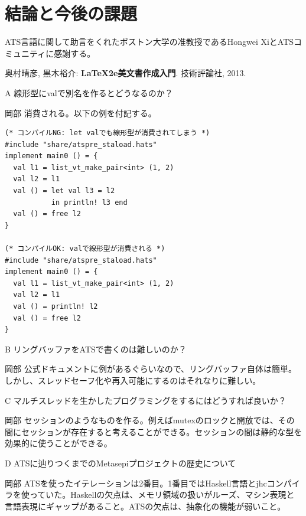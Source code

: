 \documentclass{ipsjprosym}
\begin{document}
\section{結論と今後の課題}

\begin{acknowledgment}
ATS言語に関して助言をくれたボストン大学の准教授であるHongwei XiとATSコミュニティに感謝する。
\end{acknowledgment}

% 
% 

\begin{thebibliography}{9}
  奥村晴彦, 黒木裕介: \textbf{LaTeX2e美文書作成入門}. 技術評論社, 2013.
\end{thebibliography}

\begin{QandA}
\item[A] 線形型にvalで別名を作るとどうなるのか？
\item[岡部] 消費される。以下の例を付記する。

\begin{verbatim}
(* コンパイルNG: let valでも線形型が消費されてしまう *)
#include "share/atspre_staload.hats"
implement main0 () = {
  val l1 = list_vt_make_pair<int> (1, 2)
  val l2 = l1
  val () = let val l3 = l2
           in println! l3 end
  val () = free l2
}

(* コンパイルOK: valで線形型が消費される *)
#include "share/atspre_staload.hats"
implement main0 () = {
  val l1 = list_vt_make_pair<int> (1, 2)
  val l2 = l1
  val () = println! l2
  val () = free l2
}
\end{verbatim}

\item[B] リングバッファをATSで書くのは難しいのか？
\item[岡部] 公式ドキュメントに例があるぐらいなので、リングバッファ自体は簡単。しかし、スレッドセーフ化や再入可能にするのはそれなりに難しい。
\item[C] マルチスレッドを生かしたプログラミングをするにはどうすれば良いか？
\item[岡部] セッションのようなものを作る。例えばmutexのロックと開放では、その間にセッションが存在すると考えることができる。セッションの間は静的な型を効果的に使うことができる。
\item[D] ATSに辿りつくまでのMetasepiプロジェクトの歴史について
\item[岡部] ATSを使ったイテレーションは2番目。1番目ではHaskell言語とjhcコンパイラを使っていた。Haskellの欠点は、メモリ領域の扱いがルーズ、マシン表現と言語表現にギャップがあること。ATSの欠点は、抽象化の機能が弱いこと。
\end{QandA}
\end{document}

